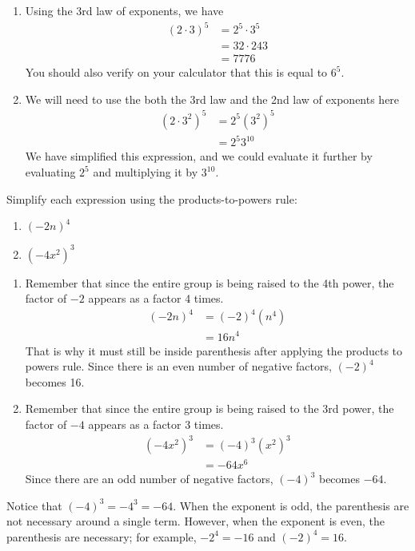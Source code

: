 \begin{myProof}
	\begin{enumerate}
		\item Using the 3rd law of exponents, we have
		\begin{align*}
			(2\cdot 3)^5 & =		2^5\cdot 3^5 \\
			             & =		32 \cdot 243 \\
			             & =		7776         
		\end{align*}	
		You should also verify on your calculator that this is equal to $6^5$.
		\item We will need to use the both the 3rd law and the 2nd law of exponents here
		\begin{align*}
			(2 \cdot 3^2)^5 & =		2^5(3^2)^5 \\	
			                & =		2^5 3^{10} 
		\end{align*}
		We have simplified this expression, and we could evaluate it further by evaluating $2^5$
		and multiplying it by $3^{10}$.
	\end{enumerate}
\end{myProof}
\begin{myexample}
Simplify each expression using the products-to-powers rule:
\begin{multicols}{2}
	\begin{enumerate}
		\item $(-2n)^4$
		\item $(-4x^2)^3$
	\end{enumerate}
\end{multicols}
\end{myexample}
\begin{myProof}
	\begin{enumerate}
		\item Remember that since the entire group is being raised to the 4th power, the 
		factor of $-2$ appears as a factor 4 times. 
		\begin{align*}
			(-2n)^4 & =		(-2)^4(n^4) \\
			        & =		16 n^4      
		\end{align*}
		That is why it must still be inside parenthesis after applying the products to powers rule. 
		Since there is an even number of negative factors, $(-2)^4$ becomes 16.
		\item Remember that since the entire group is being raised to the 3rd power, the factor
		of $-4$ appears as a factor 3 times. 
		\begin{align*}
			(-4x^2)^3 & =		(-4)^3 (x^2)^3 \\
			          & =		-64 x^6        
		\end{align*}
		Since there are an odd number of negative
		factors, $(-4)^3$ becomes $-64$.
	\end{enumerate}	
	Notice that $(-4)^3=-4^3 = -64$. When the exponent is odd, the parenthesis are not necessary
	around a single term. However, when the exponent is even, the parenthesis are necessary; for
	example, $-2^4 = -16$ and $(-2)^4 = 16$.
\end{myProof}


